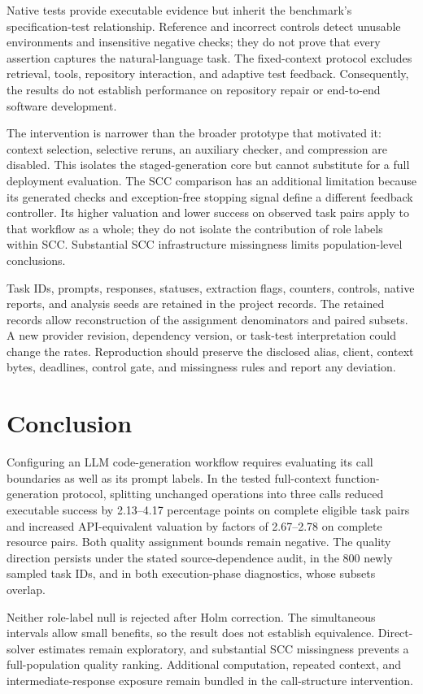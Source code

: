 Native tests provide executable evidence but inherit the benchmark's specification-test relationship. Reference and incorrect controls detect unusable environments and insensitive negative checks; they do not prove that every assertion captures the natural-language task. The fixed-context protocol excludes retrieval, tools, repository interaction, and adaptive test feedback. Consequently, the results do not establish performance on repository repair or end-to-end software development.

The intervention is narrower than the broader prototype that motivated it: context selection, selective reruns, an auxiliary checker, and compression are disabled. This isolates the staged-generation core but cannot substitute for a full deployment evaluation. The SCC comparison has an additional limitation because its generated checks and exception-free stopping signal define a different feedback controller. Its higher valuation and lower success on observed task pairs apply to that workflow as a whole; they do not isolate the contribution of role labels within SCC. Substantial SCC infrastructure missingness limits population-level conclusions.

Task IDs, prompts, responses, statuses, extraction flags, counters, controls, native reports, and analysis seeds are retained in the project records. The retained records allow reconstruction of the assignment denominators and paired subsets. A new provider revision, dependency version, or task-test interpretation could change the rates. Reproduction should preserve the disclosed alias, client, context bytes, deadlines, control gate, and missingness rules and report any deviation.

\section{Conclusion}
Configuring an LLM code-generation workflow requires evaluating its call boundaries as well as its prompt labels. In the tested full-context function-generation protocol, splitting unchanged operations into three calls reduced executable success by 2.13--4.17 percentage points on complete eligible task pairs and increased API-equivalent valuation by factors of 2.67--2.78 on complete resource pairs. Both quality assignment bounds remain negative. The quality direction persists under the stated source-dependence audit, in the 800 newly sampled task IDs, and in both execution-phase diagnostics, whose subsets overlap.

Neither role-label null is rejected after Holm correction. The simultaneous intervals allow small benefits, so the result does not establish equivalence. Direct-solver estimates remain exploratory, and substantial SCC missingness prevents a full-population quality ranking. Additional computation, repeated context, and intermediate-response exposure remain bundled in the call-structure intervention.

